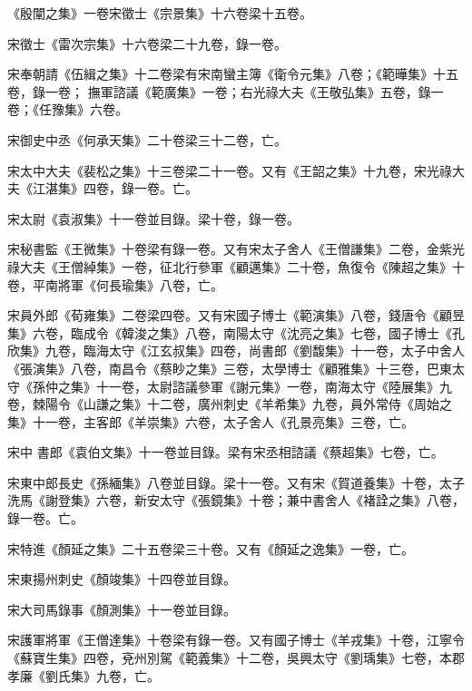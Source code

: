 \begin{pinyinscope}
 《殷闡之集》一卷宋徵士《宗景集》十六卷梁十五卷。



 宋徵士《雷次宗集》十六卷梁二十九卷，錄一卷。



 宋奉朝請《伍緝之集》十二卷梁有宋南蠻主簿《衛令元集》八卷；《範曄集》十五卷，錄一卷；
 撫軍諮議《範廣集》一卷；右光祿大夫《王敬弘集》五卷，錄一卷；《任豫集》六卷。



 宋御史中丞《何承天集》二十卷梁三十二卷，亡。



 宋太中大夫《裴松之集》十三卷梁二十一卷。又有《王韶之集》十九卷，宋光祿大夫《江湛集》四卷，錄一卷。亡。



 宋太尉《袁淑集》十一卷並目錄。梁十卷，錄一卷。



 宋秘書監《王微集》十卷梁有錄一卷。又有宋太子舍人《王僧謙集》二卷，金紫光祿大夫《王僧綽集》一卷，征北行參軍《顧邁集》二十卷，魚復令《陳超之集》十卷，平南將軍《何長瑜集》八卷，亡。



 宋員外郎《荀雍集》二卷梁四卷。又有宋國子博士《範演集》八卷，錢唐令《顧昱集》六卷，臨成令《韓浚之集》八卷，南陽太守《沈亮之集》七卷，國子博士《孔欣集》九卷，臨海太守《江玄叔集》四卷，尚書郎《劉馥集》十一卷，太子中舍人《張演集》八卷，南昌令《蔡眇之集》三卷，太學博士《顧雅集》十三卷，巴東太守《孫仲之集》十一卷，太尉諮議參軍《謝元集》一卷，南海太守《陸展集》九卷，棘陽令《山謙之集》十二卷，廣州刺史《羊希集》九卷，員外常侍《周始之集》十一卷，主客郎《羊崇集》六卷，太子舍人《孔景亮集》三卷，亡。



 宋中
 書郎《袁伯文集》十一卷並目錄。梁有宋丞相諮議《蔡超集》七卷，亡。



 宋東中郎長史《孫緬集》八卷並目錄。梁十一卷。又有宋《賀道養集》十卷，太子洗馬《謝登集》六卷，新安太守《張鏡集》十卷；兼中書舍人《褚詮之集》八卷，錄一卷。亡。



 宋特進《顏延之集》二十五卷梁三十卷。又有《顏延之逸集》一卷，亡。



 宋東揚州刺史《顏竣集》十四卷並目錄。



 宋大司馬錄事《顏測集》十一卷並目錄。



 宋護軍將軍《王僧達集》十卷梁有錄一卷。又有國子博士《羊戎集》十卷，江寧令《蘇寶生集》四卷，兗州別駕《範義集》十二卷，吳興太守《劉瑀集》七卷，本郡孝廉《劉氏集》九卷，亡。




\end{pinyinscope}
